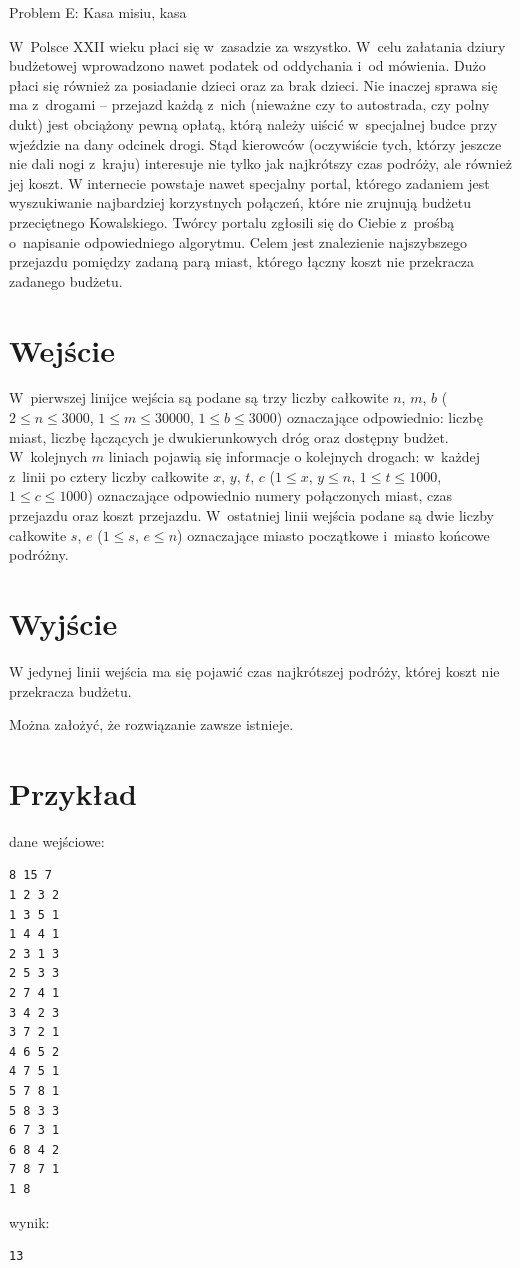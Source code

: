 \documentclass{article}
\begin{document}
\begin{center}
  \begin{Huge}
    Problem E: Kasa misiu, kasa
  \end{Huge}
\end{center}

W~Polsce XXII wieku płaci się w~zasadzie za wszystko. W~celu załatania dziury budżetowej
wprowadzono nawet podatek od oddychania i~od mówienia. Dużo płaci się również za posiadanie
dzieci oraz za brak dzieci. Nie inaczej sprawa się ma z~drogami -- przejazd każdą z~nich (nieważne
czy to autostrada, czy polny dukt) jest obciążony pewną opłatą, którą należy uiścić w~specjalnej
budce przy wjeździe na dany odcinek drogi. Stąd kierowców (oczywiście tych, którzy jeszcze nie
dali nogi z~kraju) interesuje nie tylko jak najkrótszy czas podróży, ale również jej koszt. W
internecie powstaje nawet specjalny portal, którego zadaniem jest wyszukiwanie najbardziej
korzystnych połączeń, które nie zrujnują budżetu przeciętnego Kowalskiego. Twórcy portalu
zgłosili się do Ciebie z~prośbą o~napisanie odpowiedniego algorytmu. Celem jest znalezienie
najszybszego przejazdu pomiędzy zadaną parą miast, którego łączny koszt nie przekracza zadanego
budżetu.

\section*{Wejście}

W~pierwszej linijce wejścia są podane są trzy liczby całkowite $n$, $m$, $b$ ($2\leqslant n \leqslant 3000$,
$1\leqslant m \leqslant 30000$, $1\leqslant b \leqslant 3000$) oznaczające odpowiednio: liczbę miast, liczbę łączących je
dwukierunkowych dróg oraz dostępny budżet. W~kolejnych $m$ liniach pojawią się informacje o
kolejnych drogach: w~każdej z~linii po cztery liczby całkowite $x$, $y$, $t$, $c$ ($1\leqslant x$, $y\leqslant n$, $1\leqslant t\leqslant 1000$,
$1\leqslant c\leqslant 1000$) oznaczające odpowiednio numery połączonych miast, czas przejazdu oraz koszt
przejazdu. W~ostatniej linii wejścia podane są dwie liczby całkowite $s$, $e$ ($1\leqslant s$, $e\leqslant n$) oznaczające
miasto początkowe i~miasto końcowe podróżny.

\section*{Wyjście}
W jedynej linii wejścia ma się pojawić czas najkrótszej podróży, której koszt nie przekracza
budżetu.

Można założyć, że rozwiązanie zawsze istnieje.

\section*{Przykład}
dane wejściowe:
\begin{verbatim}
8 15 7
1 2 3 2
1 3 5 1
1 4 4 1
2 3 1 3
2 5 3 3
2 7 4 1
3 4 2 3
3 7 2 1
4 6 5 2
4 7 5 1
5 7 8 1
5 8 3 3
6 7 3 1
6 8 4 2
7 8 7 1
1 8
\end{verbatim}
wynik:
\begin{verbatim}
13
\end{verbatim}
\end{document}
